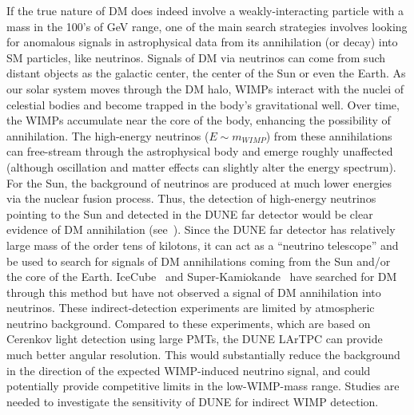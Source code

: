If the true nature of DM does indeed involve a weakly-interacting particle with a mass in the 100's of GeV range, one of the main search strategies involves looking for anomalous signals in astrophysical data from its annihilation (or decay) into SM particles, like neutrinos. Signals of DM via neutrinos can come from such distant objects as the galactic center, the center of the Sun or even the Earth. As our solar system moves through the DM halo, WIMPs interact with the nuclei of celestial bodies and become trapped in the body's gravitational well.  Over time, the WIMPs accumulate near the core of the body, enhancing the possibility of annihilation. The high-energy neutrinos ($E\sim m_{WIMP}$) from these annihilations can free-stream through the astrophysical body and emerge roughly unaffected (although oscillation and matter effects can slightly alter the energy spectrum).  For the Sun, the background of neutrinos are produced at much lower energies via the nuclear fusion process. Thus, the detection of high-energy neutrinos pointing to the Sun and detected in the DUNE far detector would be clear evidence of DM annihilation (see~\cite{Cirelli:2005gh}).  Since the DUNE far detector has relatively large mass of the order tens of kilotons, it can act as a ``neutrino telescope'' and be used to search for signals of DM annihilations coming from the Sun and/or the core of the Earth. IceCube~\cite{Aartsen:2012kia} and Super-Kamiokande~\cite{Choi:2015ara} have searched for DM through this method but have not observed a signal of DM annihilation into neutrinos.  These indirect-detection experiments  are limited by atmospheric neutrino background.  Compared to these experiments, which are based on Cerenkov light detection using large PMTs, the DUNE LArTPC can provide much better angular resolution. This would substantially reduce the background in the direction of the  expected WIMP-induced neutrino signal, and could potentially provide competitive limits in the low-WIMP-mass range.  Studies are needed to investigate the sensitivity of DUNE for indirect WIMP detection.

